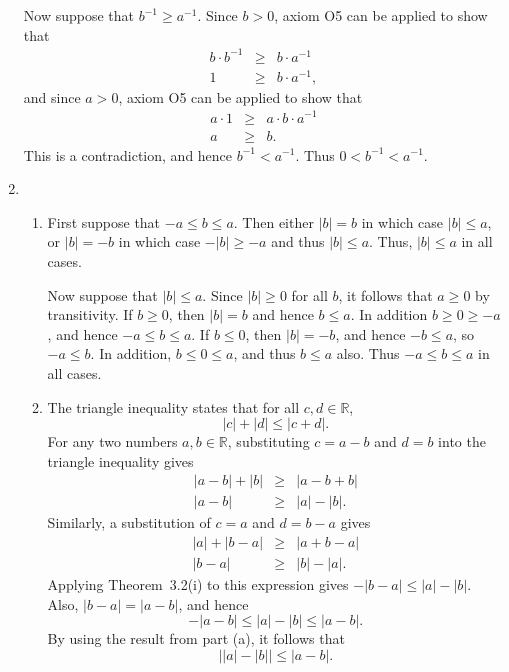 \documentclass[12pt,letterpaper]{article}
\newcommand{\R}{\mathbb{R}}
\begin{document}
\begin{enumerate}
    Now suppose that $b^{-1} \ge a^{-1}$. Since $b>0$, axiom O5 can be applied
    to show that
    \begin{eqnarray*}
      b \cdot b^{-1} &\ge& b \cdot a^{-1} \\
      1 &\ge& b \cdot a^{-1},
    \end{eqnarray*}
    and since $a>0$, axiom O5 can be applied to show that
    \begin{eqnarray*}
      a \cdot 1 &\ge& a \cdot b \cdot a^{-1} \\
      a &\ge& b.
    \end{eqnarray*}
    This is a contradiction, and hence $b^{-1} < a^{-1}$. Thus
    $0<b^{-1}<a^{-1}$.
  \item
    \begin{enumerate}
      \item First suppose that $-a\le b \le a$. Then either $|b|=b$ in which case
	$|b|\le a$, or $|b|=-b$ in which case $-|b| \ge -a$ and thus $|b| \le a$.
	Thus, $|b| \le a$ in all cases.

	Now suppose that $|b| \le a$. Since $|b|\ge 0$ for all $b$, it follows
	that $a\ge 0$ by transitivity. If $b \ge 0$, then $|b| = b$ and hence
	$b\le a$. In addition $b \ge 0 \ge -a$, and hence $-a \le b \le a$. If
	$b \le 0$, then $|b| = -b$, and hence $-b \le a$, so $-a \le b$. In
	addition, $b \le 0 \le a$, and thus $b \le a$ also. Thus $-a \le b
	\le a$ in all cases.
      \item The triangle inequality states that for all $c,d\in \R$,
	\[
	  |c| + |d| \le |c+d|.
	\]
	For any two numbers $a,b\in \R$, substituting $c=a-b$ and $d=b$ into the
	triangle inequality gives
	\begin{eqnarray*}
	  |a-b| + |b| &\ge& | a - b + b| \\
	  |a-b| &\ge& |a| - |b|.
	\end{eqnarray*}
	Similarly, a substitution of $c=a$ and $d=b-a$ gives
	\begin{eqnarray*}
	  |a| + |b-a| &\ge& | a + b -a | \\
	  |b-a| &\ge& |b| - |a|.
	\end{eqnarray*}
	Applying Theorem~3.2(i) to this expression gives $-|b-a| \le |a| - |b|$.
	Also, $|b-a| = |a-b|$, and hence
	\begin{equation}
	  -|a-b| \le |a| - |b| \le |a-b|. \label{eq:tmod}
	\end{equation}
	By using the result from part (a), it follows that
	\[
	\left| |a| - |b| \right| \le |a-b|.
	\]
    \end{enumerate}
\end{enumerate}
\end{document}
